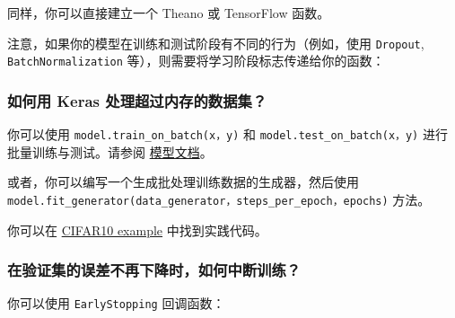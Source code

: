 同样，你可以直接建立一个 Theano 或 TensorFlow 函数。

注意，如果你的模型在训练和测试阶段有不同的行为（例如，使用
\texttt{Dropout}, \texttt{BatchNormalization}
等），则需要将学习阶段标志传递给你的函数：

\begin{Shaded}
\begin{Highlighting}[]
\OperatorTok{=} \NormalTok{K.function([model.layers[}\NormalTok{].}\NormalTok{, K.learning_phase()],}
                                  \NormalTok{[model.layers[}\NormalTok{].output])}

\OperatorTok{=} \NormalTok{get_3rd_layer_output([x, }\NormalTok{])[}\NormalTok{]}

\OperatorTok{=} \NormalTok{get_3rd_layer_output([x, }\NormalTok{])[}\NormalTok{]}
\end{Highlighting}
\end{Shaded}



\subsubsection{如何用 Keras
处理超过内存的数据集？}\label{how-can-i-use-keras-with-datasets-that-dont-fit-in-memory}

你可以使用 \texttt{model.train\_on\_batch(x，y)} 和
\texttt{model.test\_on\_batch(x，y)} 进行批量训练与测试。请参阅
\hyperref[sequential-api]{模型文档}。

或者，你可以编写一个生成批处理训练数据的生成器，然后使用
\texttt{model.fit\_generator(data\_generator，steps\_per\_epoch，epochs)}
方法。

你可以在
\href{https://github.com/keras-team/keras/blob/master/examples/cifar10_cnn.py}{CIFAR10
example} 中找到实践代码。



\subsubsection{在验证集的误差不再下降时，如何中断训练？}\label{how-can-i-interrupt-training-when-the-validation-loss-isnt-decreasing-anymore}

你可以使用 \texttt{EarlyStopping} 回调函数：

